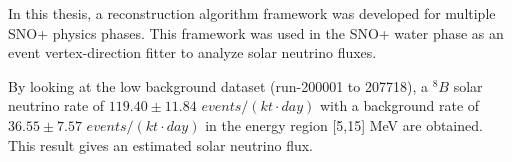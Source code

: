 In this thesis, a reconstruction algorithm framework was developed for multiple SNO+ physics phases. This framework was used in the SNO+ water phase as an event vertex-direction fitter to analyze solar neutrino fluxes.

By looking at the low background dataset (run-200001 to 207718), a $^8B$ solar neutrino rate of $119.40\pm11.84$ $events/(kt\cdot day)$ with a background rate of $36.55\pm7.57$ $events/(kt\cdot day)$ in the energy region [5,15] MeV are obtained. This result gives an estimated solar neutrino flux.